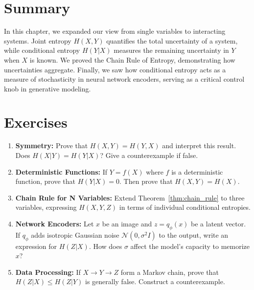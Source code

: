 \section*{Summary}
In this chapter, we expanded our view from single variables to interacting systems. Joint entropy $H(X,Y)$ quantifies the total uncertainty of a system, while conditional entropy $H(Y|X)$ measures the remaining uncertainty in $Y$ when $X$ is known. We proved the Chain Rule of Entropy, demonstrating how uncertainties aggregate. Finally, we saw how conditional entropy acts as a measure of stochasticity in neural network encoders, serving as a critical control knob in generative modeling.

\section*{Exercises}
\begin{enumerate}
    \item \textbf{Symmetry:} Prove that $H(X,Y) = H(Y,X)$ and interpret this result. Does $H(X|Y) = H(Y|X)$? Give a counterexample if false.
    \item \textbf{Deterministic Functions:} If $Y = f(X)$ where $f$ is a deterministic function, prove that $H(Y|X) = 0$. Then prove that $H(X,Y) = H(X)$.
    \item \textbf{Chain Rule for N Variables:} Extend Theorem~\ref{thm:chain_rule} to three variables, expressing $H(X,Y,Z)$ in terms of individual conditional entropies.
    \item \textbf{Network Encoders:} Let $x$ be an image and $z = q_\phi(x)$ be a latent vector. If $q_\phi$ adds isotropic Gaussian noise $\mathcal{N}(0, \sigma^2 I)$ to the output, write an expression for $H(Z|X)$. How does $\sigma$ affect the model's capacity to memorize $x$?
    \item \textbf{Data Processing:} If $X \to Y \to Z$ form a Markov chain, prove that $H(Z|X) \leq H(Z|Y)$ is generally false. Construct a counterexample.
\end{enumerate}
